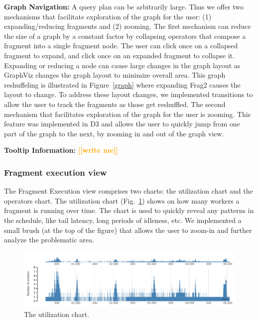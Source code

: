 \documentclass{chi2009}
\newcommand*{\fragment}{Fragment Execution\xspace}
\newcommand{\todo}[1]{\textsf{\textbf{\textcolor{Orange}{[[#1]]}}}}
\begin{document}
\textbf{Graph Navigation:} A query plan can be arbitrarily large. Thus we offer two mechanisms that facilitate exploration of the graph for the user: (1) expanding/reducing fragments and (2) zooming. The first mechanism can reduce the size of a graph by a constant factor by collapsing operators that compose a fragment into a single fragment node. The user can click once on a collapsed fragment to expand, and click once on an expanded fragment to collapse it. Expanding or reducing a node can cause large changes in the graph layout as GraphViz changes the graph layout to minimize overall area. This graph reshuffeling is illustrated in Figure~\ref{graph} where expanding Frag2 causes the layout to change. To address these layout changes, we implemented transitions to allow the user to track the fragments as those get reshuffled. The second mechanism that facilitates exploration of the graph for the user is zooming. This feature was implemented in D3 and allows the user to quickly jump from one part of the graph to the next, by zooming in and out of the graph view.

\textbf{Tooltip Information:} \todo{write me}


\subsubsection{Fragment execution view}
\label{sec:fragment}


The \fragment view comprises two charts: the utilization chart and the
operators chart. The utilization chart (Fig.~\ref{fig:utilization_chart}) shows on
how many workers a fragment is running over time. The chart is used to
quickly reveal any patterns in the schedule, like tail latency, long periods of
idleness, etc. We implemented a small brush (at the top of the figure) that
allows the user to zoom-in and further analyze the problematic area.

\begin{figure}[ht]
  \includegraphics[width=\columnwidth]{images/utilization_chart}
  \caption{The utilization chart. }
  \label{fig:utilization_chart}
\end{figure}
\end{document}
